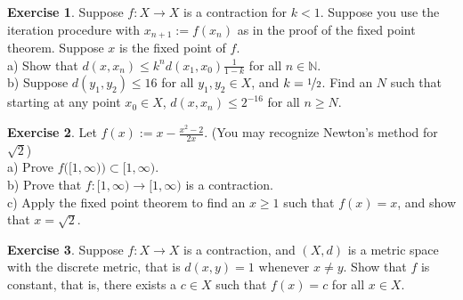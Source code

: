 \documentclass[12pt]{book}
\newcommand{\N}{{\mathbb{N}}}
\theoremstyle{plain}
\theoremstyle{remark}
\theoremstyle{definition}
\theoremstyle{exercise}
\newtheorem{exercise}{Exercise}[section]
\theoremstyle{example}
\begin{document}
\begin{exercise}
Suppose $f \colon X \to X$ is a contraction for $k < 1$.  Suppose you use the iteration
procedure with $x_{n+1} := f(x_n)$ as in the proof of the fixed point theorem.
Suppose $x$ is the fixed
point of $f$.\\
a) Show that $d(x,x_n) \leq k^n d(x_1,x_0) \frac{1}{1-k}$ for all $n \in \N$.\\
b) Suppose $d(y_1,y_2) \leq 16$ for all $y_1,y_2 \in X$, and $k=
\nicefrac{1}{2}$.  Find an $N$ such that starting at any point $x_0 \in X$, 
$d(x,x_n) \leq 2^{-16}$ for all $n \geq N$.
\end{exercise}

\begin{exercise}
Let $f(x) := x-\frac{x^2-2}{2x}$. (You may recognize Newton's method for
$\sqrt{2}$)\\
a) Prove $f\bigl([1,\infty)\bigr) \subset [1,\infty)$.\\
b) Prove that $f \colon [1,\infty) \to [1,\infty)$ is a contraction.\\
c) Apply the fixed point theorem to find an $x \geq 1$ such that
$f(x) = x$, and show that $x = \sqrt{2}$.
\end{exercise}

\begin{exercise}
Suppose $f \colon X \to X$ is a contraction, and $(X,d)$ is a metric space
with the discrete metric, that is $d(x,y) = 1$ whenever $x \not= y$.
Show that $f$ is constant, that is,
there exists a $c \in X$ such that $f(x) = c$ for all $x \in X$.
\end{exercise}

\end{document}
